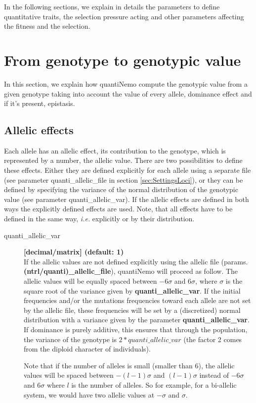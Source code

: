 \documentclass[letterpaper,12pt,oneside]{book}
\begin{document}
In the following sections, we explain in details the parameters to define quantitative traits, the selection pressure acting and other parameters affecting the fitness and the selection. 

\section{From genotype to genotypic value }
In this section, we explain how quantiNemo compute the genotypic value from a given genotype taking into account the value of every allele, dominance effect and if it's present, epistasis. 
\subsection{Allelic effects}
Each allele has an allelic effect, its contribution to the genotype, which is represented by a number, the allelic value. There are two possibilities to define these effects. Either they are defined explicitly for each allele using a separate file (see parameter \textsf{quanti\_allelic\_file} in section \ref{sec:SettingsLoci}), or they can be defined by specifying the variance of the normal distribution of the genotypic value (see parameter \textsf{quanti\_allelic\_var}). If the allelic effects are defined in both ways the explicitly defined effects are used. Note, that all effects have to be defined in the same way, \textit{i.e.} explicitly or by their distribution.

\begin{description}

\item[quanti\_allelic\_var] \textbf{[decimal/matrix]  (default: 1)}\\

If the allelic values are not defined explicitly using the allelic file (params. \textbf{(ntrl/quanti)\_allelic\_file}), quantiNemo will proceed as follow. The allelic values will be equally spaced between $-6 \sigma$ and $6 \sigma$, where $\sigma$ is the square root of the variance given by \textbf{quanti\_allelic\_var}. If the initial frequencies and/or the mutations frequencies toward each allele are not set by the allelic file, these frequencies will be set by a (discretized) normal distribution with a variance given by the parameter \textbf{quanti\_allelic\_var}. If dominance is purely additive, this ensures that through the population, the variance of the genotype is $2*quanti\_allelic\_var$ (the factor 2 comes from the diploid character of individuals).

Note that if the number of alleles is small (smaller than 6), the allelic values will be spaced between $-(l-1)\sigma$ and $(l-1)\sigma$ instead of  $-6 \sigma$ and $6 \sigma$  where $l$ is the number of alleles. So for example, for a bi-allelic system, we would have two allelic values at $-\sigma$ and $\sigma$.
\end{description} 
\end{document}
